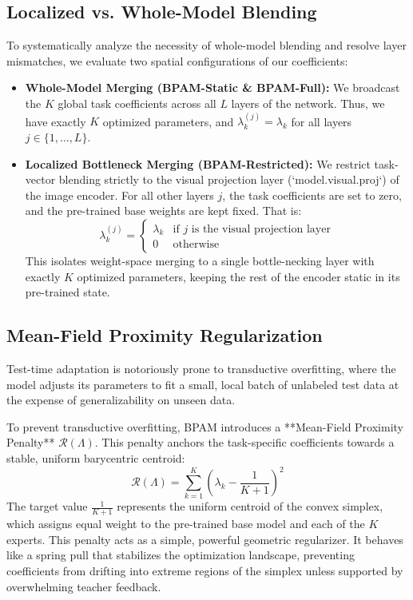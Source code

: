 \subsection{Localized vs. Whole-Model Blending}
To systematically analyze the necessity of whole-model blending and resolve layer mismatches, we evaluate two spatial configurations of our coefficients:
\begin{itemize}
    \item {\bf Whole-Model Merging (BPAM-Static \& BPAM-Full):} We broadcast the $K$ global task coefficients across all $L$ layers of the network. Thus, we have exactly $K$ optimized parameters, and $\lambda_k^{(j)} = \lambda_k$ for all layers $j \in \{1, \dots, L\}$.
    \item {\bf Localized Bottleneck Merging (BPAM-Restricted):} We restrict task-vector blending strictly to the visual projection layer (`model.visual.proj`) of the image encoder. For all other layers $j$, the task coefficients are set to zero, and the pre-trained base weights are kept fixed. That is:
    \begin{equation}
        \lambda_k^{(j)} = 
        \begin{cases} 
          \lambda_k & \text{if } j \text{ is the visual projection layer} \\ 
          0 & \text{otherwise} 
        \end{cases}
    \end{equation}
    This isolates weight-space merging to a single bottle-necking layer with exactly $K$ optimized parameters, keeping the rest of the encoder static in its pre-trained state.
\end{itemize}

\subsection{Mean-Field Proximity Regularization}
Test-time adaptation is notoriously prone to transductive overfitting, where the model adjusts its parameters to fit a small, local batch of unlabeled test data at the expense of generalizability on unseen data. 

To prevent transductive overfitting, BPAM introduces a **Mean-Field Proximity Penalty** $\mathcal{R}(\Lambda)$. This penalty anchors the task-specific coefficients towards a stable, uniform barycentric centroid:
\begin{equation}
    \mathcal{R}(\Lambda) = \sum_{k=1}^K \left( \lambda_k - \frac{1}{K+1} \right)^2
\end{equation}
The target value $\frac{1}{K+1}$ represents the uniform centroid of the convex simplex, which assigns equal weight to the pre-trained base model and each of the $K$ experts. This penalty acts as a simple, powerful geometric regularizer. It behaves like a spring pull that stabilizes the optimization landscape, preventing coefficients from drifting into extreme regions of the simplex unless supported by overwhelming teacher feedback.

